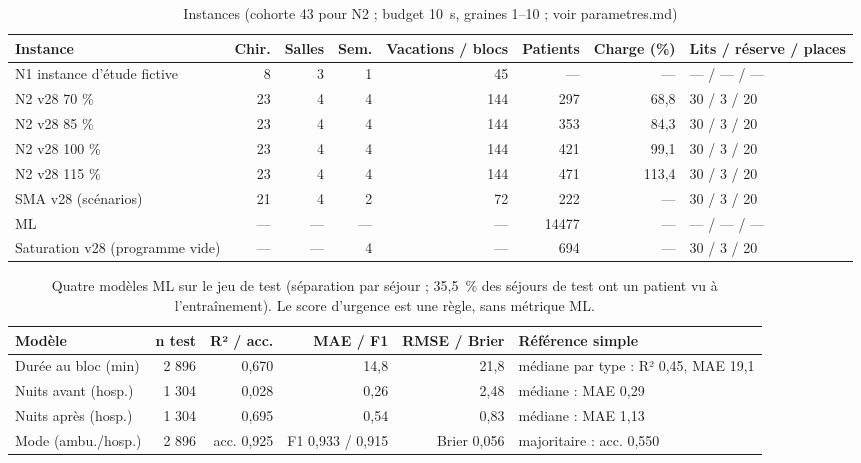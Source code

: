 
\begin{table}[htbp]
\centering
\small
\caption{Instances (cohorte 43 pour N2 ; budget 10~s, graines 1--10 ; voir parametres.md)}
\label{tab:instances}
\begin{tabular}{lrrrrrrl}
\toprule
Instance & Chir. & Salles & Sem. & Vacations / blocs & Patients & Charge (\%) & Lits / réserve / places \\
\midrule
N1 instance d'étude fictive & 8 & 3 & 1 & 45 & — & — & — / — / — \\
N2 v28 70 \% & 23 & 4 & 4 & 144 & 297 & 68,8 & 30 / 3 / 20 \\
N2 v28 85 \% & 23 & 4 & 4 & 144 & 353 & 84,3 & 30 / 3 / 20 \\
N2 v28 100 \% & 23 & 4 & 4 & 144 & 421 & 99,1 & 30 / 3 / 20 \\
N2 v28 115 \% & 23 & 4 & 4 & 144 & 471 & 113,4 & 30 / 3 / 20 \\
SMA v28 (scénarios) & 21 & 4 & 2 & 72 & 222 & — & 30 / 3 / 20 \\
ML & — & — & — & — & 14477 & — & — / — / — \\
Saturation v28 (programme vide) & — & — & 4 & — & 694 & — & 30 / 3 / 20 \\
\bottomrule
\end{tabular}
\end{table}

\begin{table}[htbp]
\centering
\small
\caption{Quatre modèles ML sur le jeu de test (séparation par séjour ; 35,5~\% des séjours de test ont un patient vu à l'entraînement). Le score d'urgence est une règle, sans métrique ML.}
\label{tab:ml}
\begin{tabular}{lrrrrl}
\toprule
Modèle & n test & R² / acc. & MAE / F1 & RMSE / Brier & Référence simple \\
\midrule
Durée au bloc (min) & 2 896 & 0,670 & 14,8 & 21,8 & médiane par type : R² 0,45, MAE 19,1 \\
Nuits avant (hosp.) & 1 304 & 0,028 & 0,26 & 2,48 & médiane : MAE 0,29 \\
Nuits après (hosp.) & 1 304 & 0,695 & 0,54 & 0,83 & médiane : MAE 1,13 \\
Mode (ambu./hosp.) & 2 896 & acc. 0,925 & F1 0,933 / 0,915 & Brier 0,056 & majoritaire : acc. 0,550 \\
\bottomrule
\end{tabular}
\end{table}

